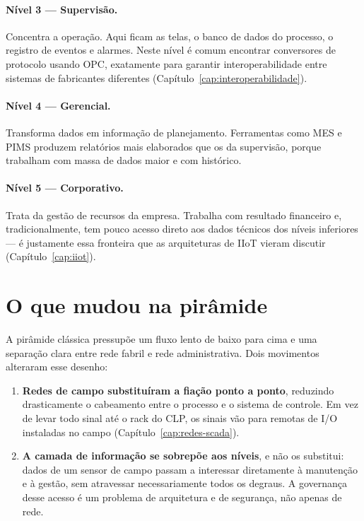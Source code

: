 \paragraph{Nível 3 --- Supervisão.} Concentra a operação. Aqui ficam as telas, o banco de dados do
processo, o registro de eventos e alarmes. Neste nível é comum encontrar conversores de protocolo
usando OPC, exatamente para garantir interoperabilidade entre sistemas de fabricantes diferentes
(Capítulo~\ref{cap:interoperabilidade}).

\paragraph{Nível 4 --- Gerencial.} Transforma dados em informação de planejamento. Ferramentas como
MES e PIMS produzem relatórios mais elaborados que os da supervisão, porque trabalham com massa de
dados maior e com histórico.

\paragraph{Nível 5 --- Corporativo.} Trata da gestão de recursos da empresa. Trabalha com resultado
financeiro e, tradicionalmente, tem pouco acesso direto aos dados técnicos dos níveis inferiores ---
é justamente essa fronteira que as arquiteturas de IIoT vieram discutir
(Capítulo~\ref{cap:iiot}).

\section{O que mudou na pirâmide}

A pirâmide clássica pressupõe um fluxo lento de baixo para cima e uma separação clara entre rede
fabril e rede administrativa. Dois movimentos alteraram esse desenho:

\begin{enumerate}
  \item \textbf{Redes de campo substituíram a fiação ponto a ponto}, reduzindo drasticamente o
        cabeamento entre o processo e o sistema de controle. Em vez de levar todo sinal até o rack
        do CLP, os sinais vão para remotas de I/O instaladas no campo
        (Capítulo~\ref{cap:redes-scada}).
  \item \textbf{A camada de informação se sobrepõe aos níveis}, e não os substitui: dados de um
        sensor de campo passam a interessar diretamente à manutenção e à gestão, sem atravessar
        necessariamente todos os degraus. A governança desse acesso é um problema de arquitetura e
        de segurança, não apenas de rede.
\end{enumerate}

